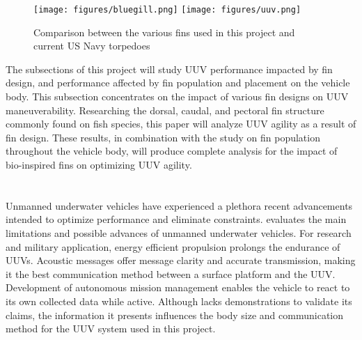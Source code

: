 \documentclass[]{IEEEtran}
\begin{document}
\begin{figure*}
\begin{center}
\texttt{[image: figures/bluegill.png]}
\texttt{[image: figures/uuv.png]}
\end{center}
\caption{Comparison between the various fins used in this project and current US Navy torpedoes \cite{lauder2004morphology}}
\label{fig:2}
\end{figure*}

The subsections of this project will study UUV performance impacted by fin design, and performance affected by fin population and placement on the vehicle body. This subsection concentrates on the impact of various fin designs on UUV maneuverability. Researching the dorsal, caudal, and pectoral fin structure commonly found on fish species, this paper will analyze UUV agility as a result of fin design.  These results, in combination with the study on fin population throughout the vehicle body, will produce complete analysis for the impact of bio-inspired fins on optimizing UUV agility.  

\section{}
Unmanned underwater vehicles have experienced a plethora recent advancements intended to optimize performance and eliminate constraints.  \cite{hiller2012expanding} evaluates the main limitations and possible advances of unmanned underwater vehicles.  For research and military application, energy efficient propulsion prolongs the endurance of UUVs.  Acoustic messages offer message clarity and accurate transmission, making it the best communication method between a surface platform and the UUV.  Development of autonomous mission management enables the vehicle to react to its own collected data while active.  Although \cite{hiller2012expanding} lacks demonstrations to validate its claims, the information it presents influences the body size and communication method for the UUV system used in this project.  
\end{document}
